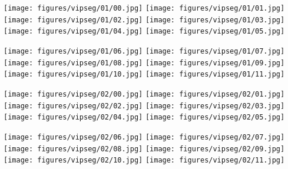 \documentclass[10pt,twocolumn,letterpaper]{article}
\begin{document}
\begin{figure*}[t]
\begin{minipage}[c]{1.00\linewidth}
\texttt{[image: figures/vipseg/01/00.jpg]}
\texttt{[image: figures/vipseg/01/01.jpg]}
\texttt{[image: figures/vipseg/01/02.jpg]}
\texttt{[image: figures/vipseg/01/03.jpg]}
\texttt{[image: figures/vipseg/01/04.jpg]}
\texttt{[image: figures/vipseg/01/05.jpg]}
\end{minipage}\hfill
\begin{minipage}[c]{1.0\linewidth}
\texttt{[image: figures/vipseg/01/06.jpg]}
\texttt{[image: figures/vipseg/01/07.jpg]}
\texttt{[image: figures/vipseg/01/08.jpg]}
\texttt{[image: figures/vipseg/01/09.jpg]}
\texttt{[image: figures/vipseg/01/10.jpg]}
\texttt{[image: figures/vipseg/01/11.jpg]}
\end{minipage}\hfill\vspace{1mm}

\begin{minipage}[c]{1.00\linewidth}
\texttt{[image: figures/vipseg/02/00.jpg]}
\texttt{[image: figures/vipseg/02/01.jpg]}
\texttt{[image: figures/vipseg/02/02.jpg]}
\texttt{[image: figures/vipseg/02/03.jpg]}
\texttt{[image: figures/vipseg/02/04.jpg]}
\texttt{[image: figures/vipseg/02/05.jpg]}
\end{minipage}\hfill
\begin{minipage}[c]{1.0\linewidth}
\texttt{[image: figures/vipseg/02/06.jpg]}
\texttt{[image: figures/vipseg/02/07.jpg]}
\texttt{[image: figures/vipseg/02/08.jpg]}
\texttt{[image: figures/vipseg/02/09.jpg]}
\texttt{[image: figures/vipseg/02/10.jpg]}
\texttt{[image: figures/vipseg/02/11.jpg]}
\end{minipage}\hfill\vspace{1mm}


\end{figure*}
\end{document}
